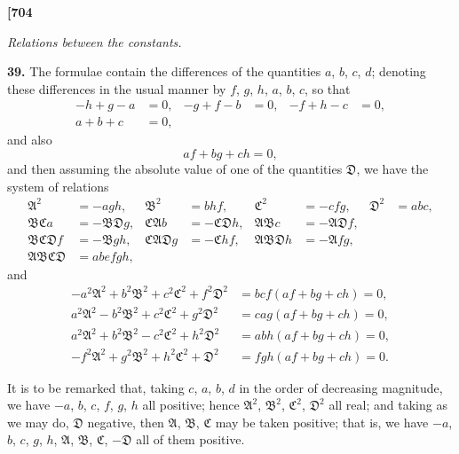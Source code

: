 \documentclass[12pt,a4paper]{article}
\theoremstyle{definition}
\begin{document}
\vspace{0.5em}

\noindent\textbf{[704}

\vspace{0.5em}

\begin{center}
\textit{Relations between the constants.}
\end{center}

\vspace{0.5em}

\noindent\textbf{39.}\quad
The formulae contain the differences of the quantities $a$, $b$, $c$, $d$; denoting these differences in the usual manner by $f$, $g$, $h$, $a$, $b$, $c$, so that
\begin{align*}
-h + g - a &= 0, & -g + f - b &= 0, & -f + h - c &= 0, \\
a + b + c &= 0,
\end{align*}
and also
\[
af + bg + ch = 0,
\]
and then assuming the absolute value of one of the quantities $\mathfrak{D}$, we have the system of relations
\begin{align*}
\mathfrak{A}^2 &= -agh, & \mathfrak{B}^2 &= bhf, & \mathfrak{C}^2 &= -cfg, & \mathfrak{D}^2 &= abc, \\
\mathfrak{B}\mathfrak{C}a &= -\mathfrak{B}\mathfrak{D}g, & \mathfrak{C}\mathfrak{A}b &= -\mathfrak{C}\mathfrak{D}h, & \mathfrak{A}\mathfrak{B}c &= -\mathfrak{A}\mathfrak{D}f, \\
\mathfrak{B}\mathfrak{C}\mathfrak{D}f &= -\mathfrak{B}gh, & \mathfrak{C}\mathfrak{A}\mathfrak{D}g &= -\mathfrak{C}hf, & \mathfrak{A}\mathfrak{B}\mathfrak{D}h &= -\mathfrak{A}fg, \\
\mathfrak{A}\mathfrak{B}\mathfrak{C}\mathfrak{D} &= abefgh,
\end{align*}
and
\begin{align*}
-a^2\mathfrak{A}^2 + b^2\mathfrak{B}^2 + c^2\mathfrak{C}^2 + f^2\mathfrak{D}^2 &= bcf(af + bg + ch) = 0, \\
a^2\mathfrak{A}^2 - b^2\mathfrak{B}^2 + c^2\mathfrak{C}^2 + g^2\mathfrak{D}^2 &= cag(af + bg + ch) = 0, \\
a^2\mathfrak{A}^2 + b^2\mathfrak{B}^2 - c^2\mathfrak{C}^2 + h^2\mathfrak{D}^2 &= abh(af + bg + ch) = 0, \\
-f^2\mathfrak{A}^2 + g^2\mathfrak{B}^2 + h^2\mathfrak{C}^2 + \mathfrak{D}^2 &= fgh(af + bg + ch) = 0.
\end{align*}

It is to be remarked that, taking $c$, $a$, $b$, $d$ in the order of decreasing magnitude, we have $-a$, $b$, $c$, $f$, $g$, $h$ all positive; hence $\mathfrak{A}^2$, $\mathfrak{B}^2$, $\mathfrak{C}^2$, $\mathfrak{D}^2$ all real; and taking as we may do, $\mathfrak{D}$ negative, then $\mathfrak{A}$, $\mathfrak{B}$, $\mathfrak{C}$ may be taken positive; that is, we have $-a$, $b$, $c$, $g$, $h$, $\mathfrak{A}$, $\mathfrak{B}$, $\mathfrak{C}$, $-\mathfrak{D}$ all of them positive.
\end{document}
